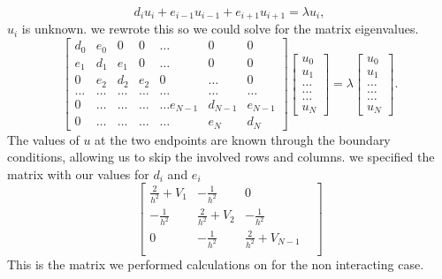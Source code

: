 \documentclass[%
reprint,
superscriptaddress,
showpacs,
nofootinbib,
bibnotes,amsmath,amssymb,aps,
prc, 
]{revtex4-1}
\begin{document}
	\begin{equation*}
		d_iu_i+e_{i-1}u_{i-1}+e_{i+1}u_{i+1}  = \lambda u_i,
	\end{equation*}
	$u_i$ is unknown. we rewrote this so we could solve for the matrix eigenvalues.
	\begin{equation*}
		\begin{bmatrix}d_0 & e_0 & 0   & 0    & \dots  &0     & 0 \\
			e_1 & d_1 & e_1 & 0    & \dots  &0     &0 \\
			0   & e_2 & d_2 & e_2  &0       &\dots & 0\\
			\dots  & \dots & \dots & \dots  &\dots      &\dots & \dots\\
			0   & \dots & \dots & \dots  &\dots  e_{N-1}     &d_{N-1} & e_{N-1}\\
			0   & \dots & \dots & \dots  &\dots       &e_{N} & d_{N}
		\end{bmatrix}  \begin{bmatrix} u_{0} \\
			u_{1} \\
			\dots\\ \dots\\ \dots\\
			u_{N}
		\end{bmatrix}=\lambda \begin{bmatrix} u_{0} \\
			u_{1} \\
			\dots\\ \dots\\ \dots\\
			u_{N}
		\end{bmatrix}.  
		\label{eq:sematrix}
	\end{equation*}
	The values of $u$ at the two endpoints are known through the boundary conditions, allowing us to skip the involved rows and columns. we specified the matrix with our values for $d_i$ and $e_i$
	\begin{equation*}
		\begin{bmatrix} \frac{2}{h^2}+V_1 & -\frac{1}{h^2} & 0        \\
			-\frac{1}{h^2} & \frac{2}{h^2}+V_2 & -\frac{1}{h^2}     \\
			0   & -\frac{1}{h^2} & \frac{2}{h^2}+V_{N-1} &     \\
			
		\end{bmatrix}
		\label{eq:matrixse} 
	\end{equation*}
	This is the matrix we performed calculations on for the non interacting case.
	
\end{document}
